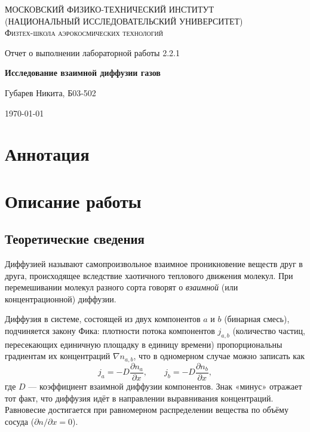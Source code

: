 \documentclass[a4paper]{article}
\begin{document}
	
	\begin{titlepage}
		\centering
		{\scshape\Large МОСКОВСКИЙ ФИЗИКО-ТЕХНИЧЕСКИЙ ИНСТИТУТ \\
			(НАЦИОНАЛЬНЫЙ ИССЛЕДОВАТЕЛЬСКИЙ УНИВЕРСИТЕТ)\\ %
			Физтех-школа аэрокосмических технологий}
		
		\vspace{4cm} %
		{\LARGE Отчет о выполнении лабораторной работы 2.2.1}
		\vspace{1cm} %
		
		{\huge\bf Исследование взаимной диффузии газов}
		
		\vspace{1cm} %
		\vfill %
		
		\begin{flushright} %
			{\LARGE Губарев Никита, Б03-502}
		\end{flushright}
		\vfill 
		\today %
	\end{titlepage}
	\tableofcontents 
	\section{Аннотация}
	
	\section{Описание работы}
	\subsection{Теоретические сведения}
	
	Диффузией называют самопроизвольное взаимное проникновение веществ друг в друга, происходящее вследствие хаотичного теплового движения молекул. При перемешивании молекул разного сорта говорят о \textit{взаимной} (или концентрационной) диффузии.
	
	Диффузия в системе, состоящей из двух компонентов $a$ и $b$ (бинарная смесь), подчиняется закону Фика: плотности потока компонентов $j_{a,b}$ (количество частиц, пересекающих единичную площадку в единицу времени) пропорциональны градиентам их концентраций $\nabla n_{a,b}$, что в одномерном случае можно записать как
	\[
	j_a = -D \frac{\partial n_a}{\partial x}, \qquad j_b = -D \frac{\partial n_b}{\partial x},
	\]
	где $D$ — коэффициент взаимной диффузии компонентов. Знак «минус» отражает тот факт, что диффузия идёт в направлении выравнивания концентраций. Равновесие достигается при равномерном распределении вещества по объёму сосуда ($\partial n / \partial x = 0$).
	
\end{document}
